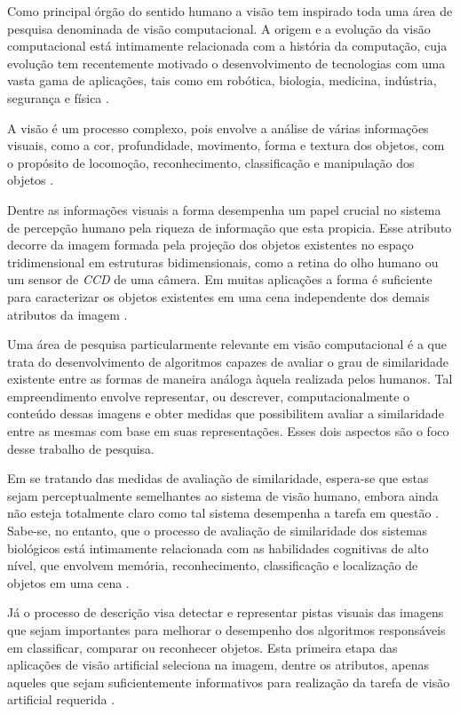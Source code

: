 Como principal órgão do sentido humano a visão tem inspirado toda uma área de pesquisa denominada de visão computacional. A origem e a evolução da visão computacional está intimamente relacionada com a história da computação, cuja evolução tem recentemente motivado o desenvolvimento de tecnologias com uma vasta gama de aplicações, tais como em robótica, biologia, medicina, indústria, segurança e física \cite{Costa:2009}.

A visão é um processo complexo, pois envolve a análise de várias informações visuais, como a cor, profundidade, movimento, forma e textura dos objetos, com o propósito de locomoção, reconhecimento, classificação e manipulação dos objetos \cite{Ullman:1996}.

Dentre as informações visuais a forma desempenha um papel crucial no sistema de percepção humano pela riqueza de informação que esta propicia. Esse atributo decorre da imagem formada pela projeção dos objetos existentes no espaço tridimensional em estruturas bidimensionais, como a retina do olho humano ou um sensor de \emph{CCD} de uma câmera. Em muitas aplicações a forma é suficiente para caracterizar os objetos existentes em uma cena independente dos demais atributos da imagem \cite{Costa:2009}.

Uma área de pesquisa particularmente relevante em visão computacional é a que trata do desenvolvimento de algoritmos capazes de avaliar o grau de similaridade existente entre as formas de maneira análoga àquela realizada pelos humanos. Tal empreendimento envolve representar, ou descrever, computacionalmente o conteúdo dessas imagens e obter medidas que possibilitem avaliar a similaridade entre as mesmas com base em suas representações. Esses dois aspectos são o foco desse trabalho de pesquisa.

Em se tratando das medidas de avaliação de similaridade, espera-se que estas sejam perceptualmente semelhantes ao sistema de visão humano, embora ainda não esteja totalmente claro como tal sistema desempenha a tarefa em questão \cite{4815272}. Sabe-se, no entanto, que o processo de avaliação de similaridade dos sistemas biológicos está intimamente relacionada com as habilidades cognitivas de alto nível, que envolvem memória, reconhecimento, classificação e localização de objetos em uma cena \cite{Marr:1982}. 

Já o processo de descrição visa detectar e representar pistas visuais das imagens que sejam importantes para melhorar o desempenho dos algoritmos responsáveis em classificar, comparar ou reconhecer objetos. Esta primeira etapa das aplicações de visão artificial seleciona na imagem, dentre os atributos, apenas aqueles que sejam suficientemente informativos para realização da tarefa de visão artificial requerida \cite{Escolano:2009}.

